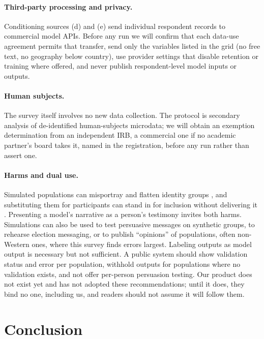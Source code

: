 \documentclass[11pt]{article}
\begin{document}
\paragraph{Third-party processing and privacy.} Conditioning sources (d) and (e) send individual respondent records to commercial model APIs. Before any run we will confirm that each data-use agreement permits that transfer, send only the variables listed in the grid (no free text, no geography below country), use provider settings that disable retention or training where offered, and never publish respondent-level model inputs or outputs.

\paragraph{Human subjects.} The survey itself involves no new data collection. The protocol is secondary analysis of de-identified human-subjects microdata; we will obtain an exemption determination from an independent IRB, a commercial one if no academic partner's board takes it, named in the registration, before any run rather than assert one.

\paragraph{Harms and dual use.} Simulated populations can misportray and flatten identity groups \citep{wang2024flatten}, and substituting them for participants can stand in for inclusion without delivering it \citep{agnew2024}. Presenting a model's narrative as a person's testimony invites both harms. Simulations can also be used to test persuasive messages on synthetic groups, to rehearse election messaging, or to publish ``opinions'' of populations, often non-Western ones, where this survey finds errors largest. Labeling outputs as model output is necessary but not sufficient. A public system should show validation status and error per population, withhold outputs for populations where no validation exists, and not offer per-person persuasion testing. Our product does not exist yet and has not adopted these recommendations; until it does, they bind no one, including us, and readers should not assume it will follow them.

\section{Conclusion}
\end{document}

